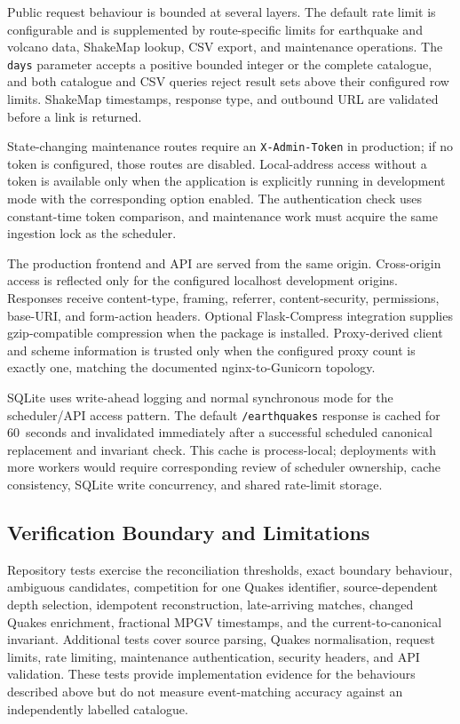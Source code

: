 \documentclass[12pt]{article}
\begin{document}
Public request behaviour is bounded at several layers. The default rate limit is configurable and is supplemented by route-specific limits for earthquake and volcano data, ShakeMap lookup, CSV export, and maintenance operations. The \texttt{days} parameter accepts a positive bounded integer or the complete catalogue, and both catalogue and CSV queries reject result sets above their configured row limits. ShakeMap timestamps, response type, and outbound URL are validated before a link is returned.

State-changing maintenance routes require an \texttt{X-Admin-Token} in production; if no token is configured, those routes are disabled. Local-address access without a token is available only when the application is explicitly running in development mode with the corresponding option enabled. The authentication check uses constant-time token comparison, and maintenance work must acquire the same ingestion lock as the scheduler.

The production frontend and API are served from the same origin. Cross-origin access is reflected only for the configured localhost development origins. Responses receive content-type, framing, referrer, content-security, permissions, base-URI, and form-action headers. Optional Flask-Compress integration supplies gzip-compatible compression when the package is installed. Proxy-derived client and scheme information is trusted only when the configured proxy count is exactly one, matching the documented nginx-to-Gunicorn topology.

SQLite uses write-ahead logging and normal synchronous mode for the scheduler/API access pattern. The default \texttt{/earthquakes} response is cached for 60~seconds and invalidated immediately after a successful scheduled canonical replacement and invariant check. This cache is process-local; deployments with more workers would require corresponding review of scheduler ownership, cache consistency, SQLite write concurrency, and shared rate-limit storage.

\subsection{Verification Boundary and Limitations}

Repository tests exercise the reconciliation thresholds, exact boundary behaviour, ambiguous candidates, competition for one Quakes identifier, source-dependent depth selection, idempotent reconstruction, late-arriving matches, changed Quakes enrichment, fractional MPGV timestamps, and the current-to-canonical invariant. Additional tests cover source parsing, Quakes normalisation, request limits, rate limiting, maintenance authentication, security headers, and API validation. These tests provide implementation evidence for the behaviours described above but do not measure event-matching accuracy against an independently labelled catalogue.
\end{document}
